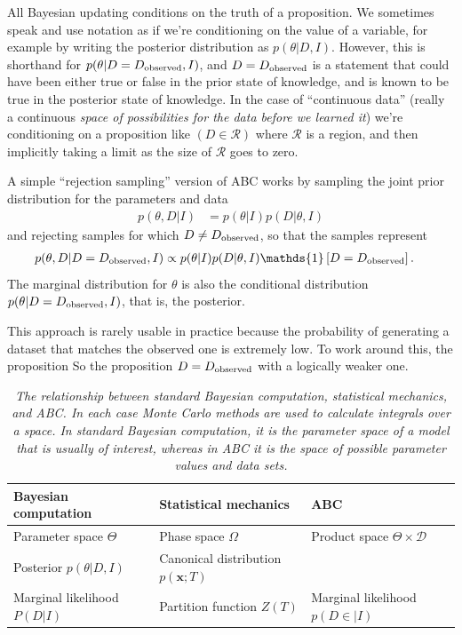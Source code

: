 \documentclass[article]{jss}
\newcommand{\params}{\theta}
\begin{document}
All Bayesian updating conditions on the truth of a proposition. We sometimes
speak and use notation as if we're conditioning on the value of a variable, for
example by writing the posterior distribution as
$p(\theta | D, I)$. However,
this is shorthand for $p(\theta | D = D_{\rm observed}, I)$, and
$D = D_{\rm observed}$ is a statement that could have been either
true or false in the prior state of knowledge, and is known to be true
in the posterior state of knowledge.
In the case of ``continuous data'' (really a continuous {\it space of
possibilities for the data before we learned it}) we're conditioning on a
proposition like $(D \in \mathcal{R})$ where $\mathcal{R}$ is a region, and
then implicitly taking a limit as the size of $\mathcal{R}$ goes to zero.

A simple ``rejection sampling'' version of
ABC works by sampling the joint prior distribution for the parameters and
data
\begin{align}
p(\theta, D | I) &= p(\theta | I)p(D | \theta, I)
\end{align}
and rejecting samples for which $D \neq D_{\rm observed}$, so that the
samples represent
\begin{align}
p(\theta, D | D = D_{\rm observed}, I) &\propto p(\theta | I)p(D | \theta, I)
\mathds{1}\left[D = D_{\rm observed}\right].
\end{align}
The marginal distribution for $\theta$ is also the conditional distribution
$p(\theta | D = D_{\rm observed}, I)$, that is, the posterior.

This approach is rarely usable in practice because the probability of
generating a dataset that matches the observed one is extremely low.
To work around this, the proposition
So the proposition $D = D_{\rm observed}$ with a logically
weaker one.

\begin{table}[ht!]
\centering
\small
\begin{tabular}{|l|l|l|}
\hline
Bayesian computation		&		Statistical mechanics		&		ABC\\
\hline
Parameter space	$\Theta$	&		Phase space	$\Omega$ 			& Product space $\Theta \times \mathcal{D}$\\
Posterior $p(\params | D,I)$   &  Canonical distribution $p(\boldsymbol{x}; T)$     & \\ 
Marginal likelihood $P(D|I)$	&	Partition function $Z(T)$	&   Marginal likelihood $p(D\in | I)$\\
\hline
\end{tabular}
\caption{\it The relationship between standard Bayesian computation, statistical
mechanics, and ABC. In each case Monte Carlo methods are used to calculate
integrals over a space. In standard Bayesian computation, it is the parameter
space of a model that is usually of interest, whereas in ABC it is the space
of possible parameter values {\it and} data sets.
\label{tab:relation}}
\end{table}
\end{document}
